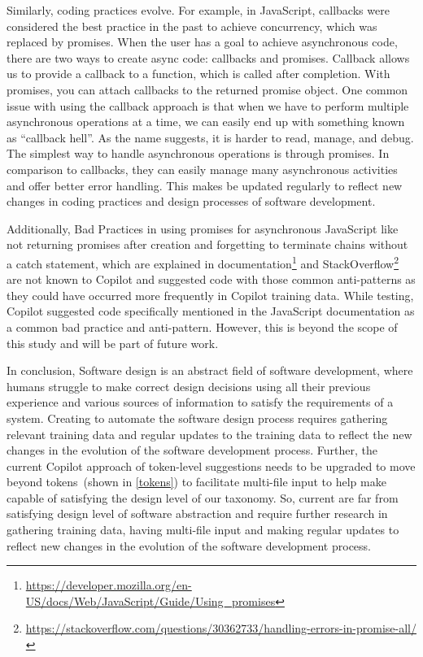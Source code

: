Similarly, coding practices evolve. 
For example, in JavaScript, callbacks were considered the best practice in the past to achieve concurrency, which was replaced by promises. 
When the user has a goal to achieve asynchronous code, there are two ways to create async code: callbacks and promises. Callback allows us to provide a callback to a function, which is called after completion. With promises, you can attach callbacks to the returned promise object.
One common issue with using the callback approach is that when we have to perform multiple asynchronous operations at a time, we can easily end up with something known as ``callback hell''.
As the name suggests, it is harder to read, manage, and debug. The simplest way to handle asynchronous operations is through promises. In comparison to callbacks, they can easily manage many asynchronous activities and offer better error handling.
This makes \cct{} be updated regularly to reflect new changes in coding practices and design processes of software development. 

Additionally, Bad Practices in using promises for asynchronous JavaScript like not returning promises after creation and forgetting to terminate chains without a catch statement, which are explained in documentation\footnote{\label{docs}\url{https://developer.mozilla.org/en-US/docs/Web/JavaScript/Guide/Using_promises}} and StackOverflow\footnote{\url{https://stackoverflow.com/questions/30362733/handling-errors-in-promise-all/}} are not known to Copilot and suggested code with those common anti-patterns as they could have occurred more frequently in Copilot training data. 
While testing, Copilot suggested code specifically mentioned in the JavaScript documentation as a common bad practice and anti-pattern.
However, this is beyond the scope of this study and will be part of future work.

In conclusion, Software design is an abstract field of software development, where humans struggle to make correct design decisions using all their previous experience and various sources of information to satisfy the requirements of a system. 
Creating \cct{} to automate the software design process requires gathering relevant training data and regular updates to the training data to reflect the new changes in the evolution of the software development process.
Further, the current Copilot approach of token-level suggestions needs to be upgraded to move beyond tokens~(shown in \ref{tokens}) to facilitate multi-file input to help make \cct{} capable of satisfying the design level of our taxonomy.
So, current \cct{} are far from satisfying design level of software abstraction and require further research in gathering training data, having multi-file input and making regular updates to reflect new changes in the evolution of the software development process.